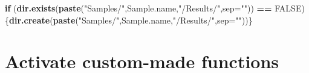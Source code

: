 \documentclass[]{article}
\newenvironment{Shaded}{\begin{snugshade}}{\end{snugshade}}
\newcommand{\KeywordTok}[1]{\textcolor[rgb]{0.13,0.29,0.53}{\textbf{#1}}}
\newcommand{\DataTypeTok}[1]{\textcolor[rgb]{0.13,0.29,0.53}{#1}}
\newcommand{\StringTok}[1]{\textcolor[rgb]{0.31,0.60,0.02}{#1}}
\newcommand{\OtherTok}[1]{\textcolor[rgb]{0.56,0.35,0.01}{#1}}
\newcommand{\ControlFlowTok}[1]{\textcolor[rgb]{0.13,0.29,0.53}{\textbf{#1}}}
\newcommand{\OperatorTok}[1]{\textcolor[rgb]{0.81,0.36,0.00}{\textbf{#1}}}
\newcommand{\NormalTok}[1]{#1}
\begin{document}
\begin{Shaded}
\begin{Highlighting}[]
\ControlFlowTok{if}\NormalTok{ (}\KeywordTok{dir.exists}\NormalTok{(}\KeywordTok{paste}\NormalTok{(}\StringTok{"Samples/"}\NormalTok{,Sample.name,}\StringTok{"/Results/"}\NormalTok{,}\DataTypeTok{sep=}\StringTok{""}\NormalTok{)) }\OperatorTok{==}\StringTok{ }\OtherTok{FALSE}\NormalTok{) \{}\KeywordTok{dir.create}\NormalTok{(}\KeywordTok{paste}\NormalTok{(}\StringTok{"Samples/"}\NormalTok{,Sample.name,}\StringTok{"/Results/"}\NormalTok{,}\DataTypeTok{sep=}\StringTok{""}\NormalTok{))\}}
\end{Highlighting}
\end{Shaded}

\section{Activate custom-made
functions}\label{activate-custom-made-functions}
\end{document}
